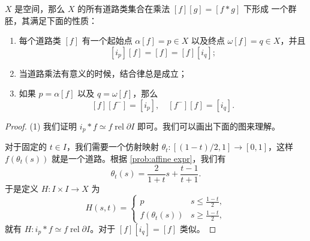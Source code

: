 \documentclass[fontset=none]{Notes}
\DeclareMathOperator\rel{rel}
\newcommand{\partI}{\partial I}
\newcommand{\relhomo}{\rel\partI}
\begin{document}
\begin{theorem}\label{thm:groupoid}
  $X$ 是空间，那么 $X$ 的所有道路类集合在乘法 $[f][g]=[f*g]$ 下形成
  一个群胚，其满足下面的性质：
  \begin{enumerate}
    \item 每个道路类 $[f]$ 有一个起始点 $\alpha[f]=p\in X$ 
    以及终点 $\omega[f]=q\in X$，并且
    \[
      [i_p][f]=[f]=[f][i_q];
    \]
    \item 当道路乘法有意义的时候，结合律总是成立；
    \item 如果 $p=\alpha[f]$ 以及 $q=\omega[f]$，那么
    \[
      [f][f^-]=[i_p],\quad [f^-][f]=[i_q].
    \]
  \end{enumerate}
\end{theorem}
\begin{proof}
  (1) 我们证明 $i_p*f\simeq f\relhomo$ 即可。我们可以画出下面的图来理解。
  \begin{center}
  \end{center}
  对于固定的 $t\in I$，我们需要一个仿射映射 $\theta_t:[(1-t)/2,1]\to [0,1]$，这样
  $f(\theta_t(s))$ 就是一个道路。根据 \ref{prob:affine expr}，我们有
  \[
    \theta_t(s)=\frac{2}{1+t}s+\frac{t-1}{t+1}.
  \]
  于是定义 $H:I\times I\to X$ 为
  \[
    H(s,t)=\begin{cases}
      p & s\leq \frac{1-t}{2},\\
      f(\theta_t(s)) & s\geq \frac{1-t}{2},
    \end{cases}
  \]
  就有 $H:i_p*f\simeq f\relhomo$。对于 $[f][i_q]=[f]$ 类似。


\end{proof}
\end{document}
